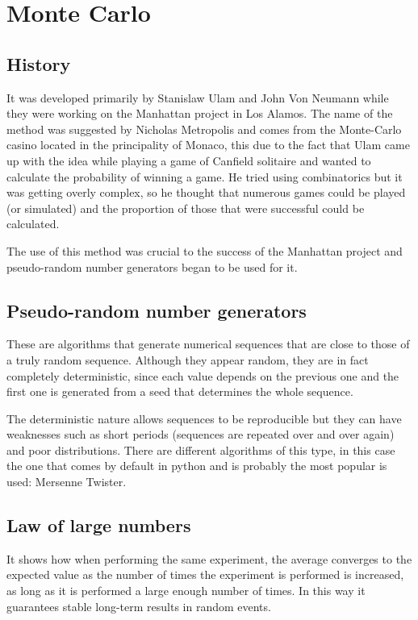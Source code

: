 \section{Monte Carlo}

\subsection{History}

It was developed primarily by Stanislaw Ulam and John Von Neumann while they were working on the Manhattan project in Los Alamos. The name of the method was suggested by Nicholas Metropolis and comes from the Monte-Carlo casino located in the principality of Monaco, this due to the fact that Ulam came up with the idea while playing a game of Canfield solitaire and wanted to calculate the probability of winning a game. He tried using combinatorics but it was getting overly complex, so he thought that numerous games could be played (or simulated) and the proportion of those that were successful could be calculated.

The use of this method was crucial to the success of the Manhattan project and pseudo-random number generators began to be used for it.

\subsection{Pseudo-random number generators}

These are algorithms that generate numerical sequences that are close to those of a truly random sequence. Although they appear random, they are in fact completely deterministic, since each value depends on the previous one and the first one is generated from a seed that determines the whole sequence.

The deterministic nature allows sequences to be reproducible but they can have weaknesses such as short periods (sequences are repeated over and over again) and poor distributions. There are different algorithms of this type, in this case the one that comes by default in python and is probably the most popular is used: Mersenne Twister.

\subsection{Law of large numbers}

It shows how when performing the same experiment, the average converges to the expected value as the number of times the experiment is performed is increased, as long as it is performed a large enough number of times. In this way it guarantees stable long-term results in random events.

